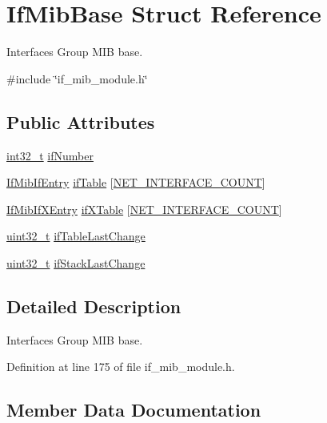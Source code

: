 \hypertarget{structIfMibBase}{}\section{If\+Mib\+Base Struct Reference}
\label{structIfMibBase}


Interfaces Group M\+IB base.  




{\ttfamily \#include \char`\"{}if\+\_\+mib\+\_\+module.\+h\char`\"{}}

\subsection*{Public Attributes}
\begin{DoxyCompactItemize}
\item 
\hyperlink{stdint_8h_ab1967d8591af1a4e48c37fd2b0f184d0}{int32\+\_\+t} \hyperlink{structIfMibBase_ad14f7109a9c9c3d47b35ba1ac0603ba5}{if\+Number}
\item 
\hyperlink{structIfMibIfEntry}{If\+Mib\+If\+Entry} \hyperlink{structIfMibBase_a68d4daf12c07778493a7018d4f495252}{if\+Table} \mbox{[}\hyperlink{net__config_8h_a116f850ebcb023ffa3e6b8de10c5cb35}{N\+E\+T\+\_\+\+I\+N\+T\+E\+R\+F\+A\+C\+E\+\_\+\+C\+O\+U\+NT}\mbox{]}
\item 
\hyperlink{structIfMibIfXEntry}{If\+Mib\+If\+X\+Entry} \hyperlink{structIfMibBase_aa6225a41e399254043fd5a537cb30c81}{if\+X\+Table} \mbox{[}\hyperlink{net__config_8h_a116f850ebcb023ffa3e6b8de10c5cb35}{N\+E\+T\+\_\+\+I\+N\+T\+E\+R\+F\+A\+C\+E\+\_\+\+C\+O\+U\+NT}\mbox{]}
\item 
\hyperlink{stdint_8h_a435d1572bf3f880d55459d9805097f62}{uint32\+\_\+t} \hyperlink{structIfMibBase_a90837fc3ab805768087b0b9308e9ee2f}{if\+Table\+Last\+Change}
\item 
\hyperlink{stdint_8h_a435d1572bf3f880d55459d9805097f62}{uint32\+\_\+t} \hyperlink{structIfMibBase_a8426af9dacde8f376bcc4586c374cb80}{if\+Stack\+Last\+Change}
\end{DoxyCompactItemize}


\subsection{Detailed Description}
Interfaces Group M\+IB base. 

Definition at line 175 of file if\+\_\+mib\+\_\+module.\+h.



\subsection{Member Data Documentation}
\mbox{\label{structIfMibBase_ad14f7109a9c9c3d47b35ba1ac0603ba5}} 
